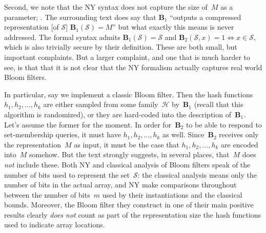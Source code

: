 Second, we note that the NY syntax does not capture the size of~$M$
as a parameter;  .
  The surrounding text does say that
$\mathbf{B}_1$ ``outputs a compressed representation [of
$\mathcal{S}$] $\mathbf{B}_1(\mathcal{S})=M$'' but what exactly this
means is never addressed. The formal syntax admits
$\mathbf{B}_1(\mathcal{S})=\mathcal{S}$ and
$\mathbf{B}_2(\mathcal{S},x)=1 \Leftrightarrow x \in \mathcal{S}$,
which is also trivially secure by their definition.  These are both
small, but important complaints. But a larger complaint, and one
that is much harder to see, is that that it is not clear that the NY
formalism actually captures real world Bloom filters.

In particular, say we implement a classic Bloom filter.  Then the hash functions $h_1, h_2, \ldots, h_k$ are either sampled from some family~$\mathcal{H}$ by~$\mathbf{B}_1$ (recall that this algorithm is randomized), or they are hard-coded into the description of~$\mathbf{B}_1$.  Let's assume the former for the moment.  In order for~$\mathbf{B}_2$ to be able to respond to set-membership queries, it must have $h_1,h_2,\ldots,h_k$ as well. Since~$\mathbf{B}_2$ receives only the representation~$M$ as input, it must be the case that $h_1,h_2,\ldots,h_k$ are encoded into~$M$ somehow.  But the text strongly suggests, in several places, that~$M$ does \emph{not} include these.  Both NY and classical analysis of Bloom filters speak of the number of bits used to represent the set~$\mathcal{S}$: the classical analysis means only the number of bits in the actual array, and NY make comparisons throughout between the number of bits~$m$ used by their instantiations and the classical bounds. Moreover, the Bloom filter they construct in one of their main positive results clearly \emph{does not} count as part of the representation size the hash functions used to indicate array locations.

